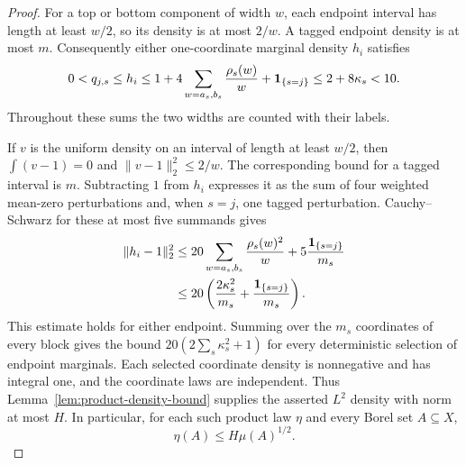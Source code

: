 \begin{proof}
For a top or bottom component of width $w$, each endpoint interval has
length at least $w/2$, so its density is at most $2/w$.  A tagged
endpoint density is at most $m$.  Consequently either one-coordinate
marginal density $h_i$ satisfies
\[
 0<q_{j,s}\le h_i
 \le1+4\sum_{w=a_s,b_s}\frac{\rho_s(w)}w+\mathbf 1_{\{s=j\}}
 \le2+8\kappa_s<10.
\]
Throughout these sums the two widths are counted with their labels.

If $v$ is the uniform density on an interval of length at least $w/2$,
then $\int(v-1)=0$ and $\|v-1\|_2^2\le2/w$.  The corresponding
bound for a tagged interval is $m$.  Subtracting $1$ from $h_i$
expresses it as the sum of four weighted mean-zero perturbations and,
when $s=j$, one tagged perturbation.  Cauchy--Schwarz for these at most
five summands gives
\begin{equation}\label{p:eq:marginal-energy}
 \begin{split}
 \|h_i-1\|_2^2
 &\le20\sum_{w=a_s,b_s}\frac{\rho_s(w)^2}{w}
                    +5\frac{\mathbf 1_{\{s=j\}}}{m_s}\\
 &\le20\left(\frac{2\kappa_s^2}{m_s}
                    +\frac{\mathbf 1_{\{s=j\}}}{m_s}\right).
 \end{split}
\end{equation}
This estimate holds for either endpoint.  Summing over the $m_s$
coordinates of every block gives the bound
$20(2\sum_s\kappa_s^2+1)$ for every deterministic selection of endpoint
marginals.  Each selected coordinate density is nonnegative and has
integral one, and the coordinate laws are independent.  Thus
Lemma~\ref{lem:product-density-bound} supplies the asserted $L^2$ density
with norm at most $H$.  In particular, for each such product law $\eta$
and every Borel set $A\subseteq X$,
\begin{equation}\label{p:eq:uniform-absolute-continuity}
 \eta(A)\le H\mu(A)^{1/2}.
\end{equation}


\end{proof}
